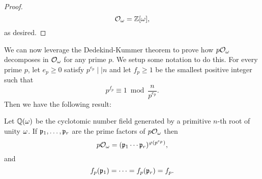 \begin{proof}
      \[
        \mathcal{O}_{\omega} = \mathbb{Z}[\omega],
      \]
      as desired.
    \end{proof}

    We can now leverage the Dedekind-Kummer theorem to prove how $p\mathcal{O}_{\omega}$ decomposes in $\mathcal{O}_{\omega}$ for any prime $p$. We setup some notation to do this. For every prime $p$, let $e_{p} \ge 0$ satisfy $p^{e_{p}} \mid\mid n$ and let $f_{p} \ge 1$ be the smallest positive integer such that
      \[
        p^{f_{p}} \equiv 1 \bmod{\frac{n}{p^{e_{p}}}}.
      \]
    Then we have the following result:

    \begin{proposition}\label{prop:factorization_of_primes_cyclotomic}
      Let $\mathbb{Q}(\omega)$ be the cyclotomic number field generated by a primitive $n$-th root of unity $\omega$. If $\mathfrak{p}_{1},\ldots,\mathfrak{p}_{r}$ are the prime factors of $p\mathcal{O}_{\omega}$ then
      \[
        p\mathcal{O}_{\omega} = (\mathfrak{p}_{1} \cdots \mathfrak{p}_{r})^{\varphi(p^{e_{p}})},
      \]
      and
      \[
        f_{p}(\mathfrak{p}_{1}) = \cdots = f_{p}(\mathfrak{p}_{r}) = f_{p}.
      \]
    \end{proposition}
